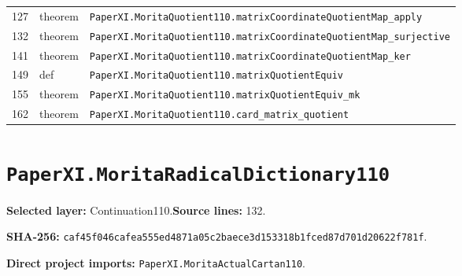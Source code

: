 \documentclass[10pt,oneside]{book}
\begin{document}
\begin{longtable}{@{}p{}p{}p{}@{}}
127&theorem&\nolinkurl{PaperXI.MoritaQuotient110.matrixCoordinateQuotientMap_apply}\\

132&theorem&\nolinkurl{PaperXI.MoritaQuotient110.matrixCoordinateQuotientMap_surjective}\\

141&theorem&\nolinkurl{PaperXI.MoritaQuotient110.matrixCoordinateQuotientMap_ker}\\

149&def&\nolinkurl{PaperXI.MoritaQuotient110.matrixQuotientEquiv}\\

155&theorem&\nolinkurl{PaperXI.MoritaQuotient110.matrixQuotientEquiv_mk}\\

162&theorem&\nolinkurl{PaperXI.MoritaQuotient110.card_matrix_quotient}\\

\bottomrule\end{longtable}

\section{\texorpdfstring{\nolinkurl{PaperXI.MoritaRadicalDictionary110}}{PaperXI.MoritaRadicalDictionary110}}\label{module:PaperXI.MoritaRadicalDictionary110}

\textbf{Selected layer:} Continuation110.\quad\textbf{Source lines:} 132.\par\textbf{SHA-256:} {\scriptsize\nolinkurl{caf45f046cafea555ed4871a05c2baece3d153318b1fced87d701d20622f781f}}.


\textbf{Direct project imports:} \nolinkurl{PaperXI.MoritaActualCartan110}.
\end{document}
